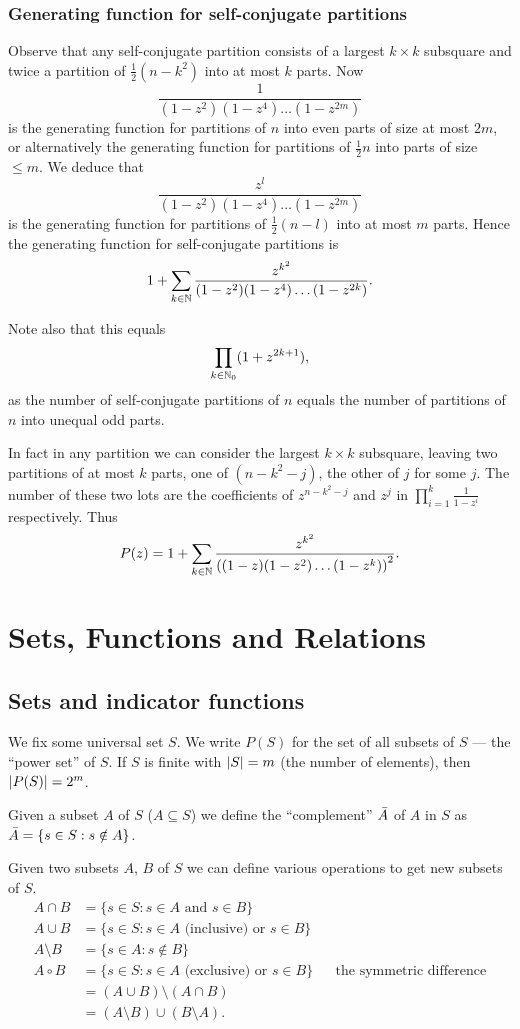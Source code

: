 \documentclass{notes}
\theoremstyle{plain}
\begin{document}
\subsection{Generating function for self-conjugate partitions}

Observe that any self-conjugate partition consists of a largest
$k \times k$ subsquare and twice a partition of $\frac{1}{2}(n-k^2)$
into at most $k$ parts.  Now
\[
\frac{1}{(1-z^2) (1-z^4) \dots (1-z^{2m})}
\]
is the generating function for partitions of $n$ into even parts
of size at most $2 m$, or alternatively the generating function for partitions
of $\frac{1}{2} n$ into parts of size $\le m$.  We deduce that
\[
\frac{z^l}{(1-z^2) (1-z^4) \dots (1-z^{2m})}
\]
is the generating function for partitions of $\frac{1}{2}(n-l)$ into at most
$m$ parts.  Hence the generating function for self-conjugate partitions is
\[
1 + \sum_{k \in \mathbb{N}} \frac{z^{k^2}}{(1-z^2) (1-z^4) \dots (1-z^{2 k})}.
\]

Note also that this equals
\[
\prod_{k \in \mathbb{N}_0} (1+z^{2 k + 1}),
\]
as the number of self-conjugate partitions of $n$ equals the number of
partitions of $n$ into unequal odd parts.

In fact in any partition we can consider the largest $k \times k$ subsquare,
leaving two partitions of at most $k$ parts, one of $(n -k^2 - j)$, the
other of $j$ for some $j$.  The number of these two lots are the coefficients
of $z^{n - k^2 - j}$ and $z^j$ in $\prod_{i=1}^k \frac{1}{1-z^i}$
respectively.  Thus
\[
P(z) = 1 + \sum_{k \in \mathbb{N}} \frac{z^{k^2}}{\left(
(1-z) (1-z^2) \dots (1-z^k)\right)^2}.
\]

\chapter{Sets, Functions and Relations}

\section{Sets and indicator functions}

We fix some universal set $S$.  We write $P(S)$ for the set of all subsets
of $S$ --- the ``power set'' of $S$.  If $S$ is finite with
$\left|S\right| = m$ (the number of elements), then $\left|P(S)\right| = 2^m$.

Given a subset $A$ of $S$ ($A \subseteq S$) we define the ``complement''
$\Bar{A}$ of $A$ in $S$ as $\Bar{A} = \{ s \in S : s \notin A \}$.

Given two subsets $A$, $B$ of $S$ we can define various operations to get
new subsets of $S$.
\begin{align*}
A \cap B &= \{ s \in S : s \in A \text{ and } s \in B \} \\
A \cup B &= \{ s \in S : s \in A \text{ (inclusive) or } s \in B \} \\
A \setminus B &= \{ s \in A : s \notin B \} \\
A \circ B & = \{s \in S : s \in A \text{ (exclusive) or } s \in B \}
& & \text{the symmetric difference} \\
&= (A \cup B) \setminus (A \cap B) \\
&= (A \setminus B) \cup (B \setminus A).
\end{align*}
\end{document}
